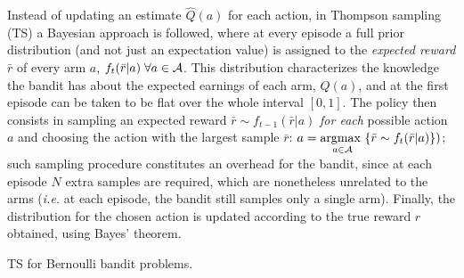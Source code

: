 Instead of updating an estimate $\hat{Q}(a)$ for each action, in Thompson sampling (TS) a Bayesian approach is followed, where at every episode a full prior distribution (and not just an expectation value) is assigned to the \emph{expected reward} $\bar{r}$ of every arm $a$, $f_{t}(\bar{r}|a) \; \forall a \in \mathcal{A}$. This distribution characterizes the knowledge the bandit has about the expected earnings of each arm, $Q(a)$, and at the first episode can be taken to be flat over the whole interval $[0,1]$. The policy then consists in sampling an expected reward $\bar{r}\sim f_{t-1}(\bar{r}|a)$
\emph{for each} possible action $a$ and choosing the action with the largest sample $\bar{r}$:
$a=\underset{a\in\mathcal{A}}{\text{argmax }}\{\bar{r}\sim f_{t}(\bar{r}|a)\})$; such sampling procedure constitutes an overhead for the bandit, since at each episode $N$ extra samples are required, which are nonetheless unrelated to the arms (\textit{i.e.} at each episode, the bandit still samples only a single arm). Finally, the distribution for the chosen action is updated according to the true reward $r$ obtained, using Bayes' theorem.

\begin{algorithm}[b!]\label{alg:tsber}
  \DontPrintSemicolon
  \SetAlgoNoEnd
\;
\caption{TS for Bernoulli bandit problems.}
\end{algorithm}

